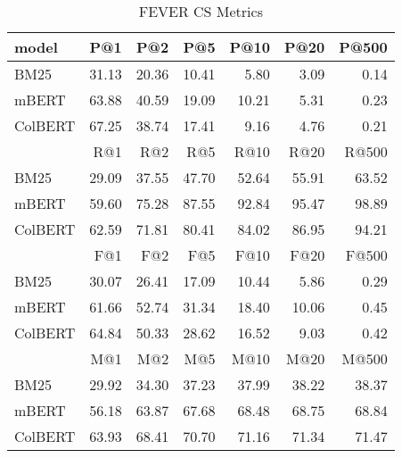 \begin{table}[!htb]
    \centering
    \begin{tabular}{lrrrrrr}
        \toprule
           model &    P@1 &    P@2 &    P@5 &   P@10 &  P@20 &  P@500 \\
        \midrule
            BM25 &  31.13 &  20.36 &  10.41 &   5.80 &  3.09 &   0.14 \\
           mBERT &  63.88 &  40.59 &  19.09 &  10.21 &  5.31 &   0.23 \\
         ColBERT &  67.25 &  38.74 &  17.41 &   9.16 &  4.76 &   0.21 \\
        \midrule
           {}    &    R@1 &    R@2 &    R@5 &   R@10 &   R@20 &  R@500 \\
        \midrule
            BM25 &  29.09 &  37.55 &  47.70 &  52.64 &  55.91 &  63.52 \\
           mBERT &  59.60 &  75.28 &  87.55 &  92.84 &  95.47 &  98.89 \\
         ColBERT &  62.59 &  71.81 &  80.41 &  84.02 &  86.95 &  94.21 \\
        \midrule
           {}    &    F@1 &    F@2 &    F@5 &   F@10 &   F@20 &   F@500 \\
        \midrule
            BM25 &  30.07 &  26.41 &  17.09 &  10.44 &   5.86 &    0.29 \\
           mBERT &  61.66 &  52.74 &  31.34 &  18.40 &  10.06 &    0.45 \\
         ColBERT &  64.84 &  50.33 &  28.62 &  16.52 &   9.03 &    0.42 \\
        \midrule
           {}    &  M@1 &  M@2 &  M@5 &  M@10 &  M@20 &  M@500 \\
        \midrule
            BM25 &  29.92 &  34.30 &  37.23 &   37.99 &   38.22 &    38.37 \\
           mBERT &  56.18 &  63.87 &  67.68 &   68.48 &   68.75 &    68.84 \\
         ColBERT &  63.93 &  68.41 &  70.70 &   71.16 &   71.34 &    71.47 \\
        \bottomrule
        \end{tabular}
    \caption[FEVER CS Metrics]{FEVER CS Metrics}
\end{table}


